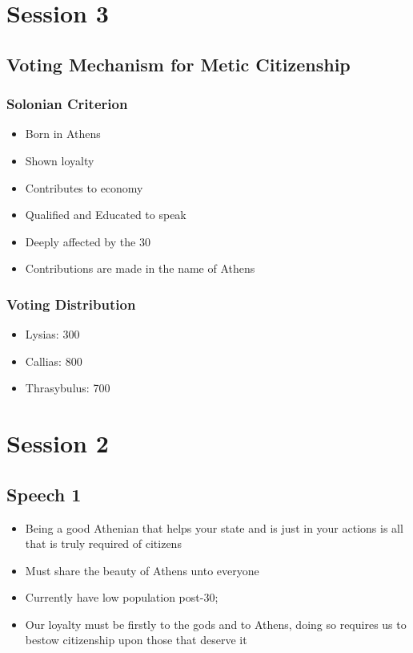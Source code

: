 \documentclass[11pt]{article}
\author{Sudhan Chitgopkar}
\date{\today}
\title{}
\begin{document}
\tableofcontents

\section{Session 3}
\label{sec:orgfe974d5}
\subsection{Voting Mechanism for Metic Citizenship}
\label{sec:orgbd88c20}
\subsubsection{Solonian Criterion}
\label{sec:org482cf06}
\begin{itemize}
\item Born in Athens
\item Shown loyalty
\item Contributes to economy
\item Qualified and Educated to speak
\item Deeply affected by the 30
\item Contributions are made in the name of Athens
\end{itemize}
\subsubsection{Voting Distribution}
\label{sec:org34bd570}
\begin{itemize}
\item Lysias: 300
\item Callias: 800
\item Thrasybulus: 700
\end{itemize}
\section{Session 2}
\label{sec:org91ff1c8}
\subsection{Speech 1}
\label{sec:orgceaf2e0}
\begin{itemize}
\item Being a good Athenian that helps your state and is just in your actions is all that is truly
required of citizens
\item Must share the beauty of Athens unto everyone
\item Currently have low population post-30;
\item Our loyalty must be firstly to the gods and to Athens, doing so requires us to bestow citizenship
upon those that deserve it
\end{itemize}
\end{document}
